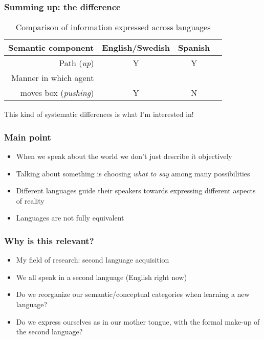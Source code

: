 \documentclass[]{beamer}
\begin{document}
\begin{frame}
	\frametitle{Summing up: the difference}
	\begin{table}
		\begin{tabular}{r c c c}
		Semantic component	& English/Swedish	& Spanish \\
		\hline
		Path (\emph{up})			& Y				& Y \\
		Manner in which agent \\moves box (\emph{pushing}) & Y & \alert{N} \\
		\end{tabular}
	\caption{Comparison of information expressed across languages}
	\end{table}
	\pause
	\begin{center}
	This kind of systematic differences is what I'm interested in!
	\end{center}
\end{frame}


\begin{frame}
	\frametitle{Main point}
	\begin{itemize}
		\item When we speak about the world we don't just describe it objectively
		\item Talking about something is choosing \emph{what to say} among many possibilities
		\item Different languages guide their speakers towards expressing different aspects of reality
		\item Languages are not fully equivalent
	\end{itemize}
\end{frame}




\begin{frame}
	\frametitle{Why is this relevant?}
	\begin{itemize}
		\item My field of research: second language acquisition
		\item We all speak in a second language (English right now)
		\item Do we reorganize our semantic/conceptual categories when learning a new language?
		\item Do we express ourselves as in our mother tongue, with the formal make-up of the second language?
	\end{itemize}
\end{frame}
\end{document}
